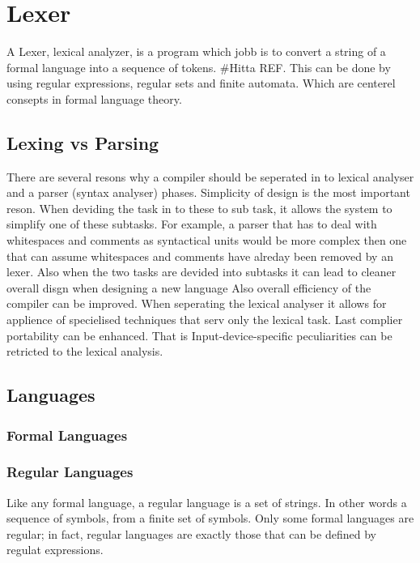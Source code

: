 \chapter{Lexer}
A Lexer, lexical analyzer, is a program which jobb is to convert a string of a
formal language into a sequence of tokens. \#Hitta REF.
This can be done by using regular expressions, regular sets and finite
automata. Which are centerel consepts in formal language theory. \cite{Aho1990}
\section{Lexing vs Parsing}
There are several resons why a compiler should be seperated in to lexical analyser and a parser (syntax analyser) phases. Simplicity of design is the most important reson. When deviding the task in to these to sub task, it allows the system to simplify one of these subtasks. For example, a parser that has to deal with whitespaces and comments as syntactical units would be more complex then one that can assume whitespaces and comments have alreday been removed by an lexer. Also when the two tasks are devided into subtasks it can lead to cleaner overall disgn when designing a new language \cite{Aho2006}
Also overall efficiency of the compiler can be improved. When seperating the lexical analyser it allows for applience of specielised techniques that serv only the lexical task. \cite{Aho2006}
Last complier portability can be enhanced. That is Input-device-specific peculiarities can be retricted to the lexical analysis. \cite{Aho2006}
\section{Languages}
\subsection{Formal Languages}
\subsection{Regular Languages}
Like any formal language, a regular language is a set of strings. In other words a sequence of symbols,
from a finite set of symbols. Only some formal languages are regular; in fact, 
regular languages are exactly those that can be defined by regulat expressions.
\cite{Ranta2012}
